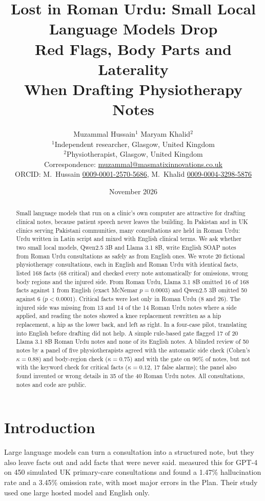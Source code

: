 \documentclass[11pt]{article}
\title{\textbf{Lost in Roman Urdu: Small Local Language Models Drop\\Red Flags, Body Parts and Laterality\\When Drafting Physiotherapy Notes}}
\author{Muzammal Hussain$^{1}$ \qquad Maryam Khalid$^{2}$\\[4pt]
\small $^{1}$Independent researcher, Glasgow, United Kingdom\\
\small $^{2}$Physiotherapist, Glasgow, United Kingdom\\
\small Correspondence: \href{mailto:muzammal@masmatixinnovations.co.uk}{muzammal@masmatixinnovations.co.uk}\\
\small ORCID: M.\ Hussain \href{https://orcid.org/0009-0001-2570-5686}{0009-0001-2570-5686}, M.\ Khalid \href{https://orcid.org/0009-0004-3298-5876}{0009-0004-3298-5876}}
\date{November 2026}
\begin{document}
\maketitle

\begin{abstract}
Small language models that run on a clinic's own computer are attractive for drafting clinical notes, because patient speech never leaves the building. In Pakistan and in UK clinics serving Pakistani communities, many consultations are held in Roman Urdu: Urdu written in Latin script and mixed with English clinical terms. We ask whether two small local models, Qwen2.5 3B and Llama 3.1 8B, write English SOAP notes from Roman Urdu consultations as safely as from English ones. We wrote 20 fictional physiotherapy consultations, each in English and Roman Urdu with identical facts, listed 168 facts (68 critical) and checked every note automatically for omissions, wrong body regions and the injured side. From Roman Urdu, Llama 3.1 8B omitted 16 of 168 facts against 1 from English (exact McNemar $p=0.0003$) and Qwen2.5 3B omitted 50 against 6 ($p<0.0001$). Critical facts were lost only in Roman Urdu (8 and 26). The injured side was missing from 13 and 14 of the 14 Roman Urdu notes where a side applied, and reading the notes showed a knee replacement rewritten as a hip replacement, a hip as the lower back, and left as right. In a four-case pilot, translating into English before drafting did not help. A simple rule-based gate flagged 17 of 20 Llama 3.1 8B Roman Urdu notes and none of its English notes. A blinded review of 50 notes by a panel of five physiotherapists agreed with the automatic side check (Cohen's $\kappa=0.88$) and body-region check ($\kappa=0.75$) and with the gate on 90\% of notes, but not with the keyword check for critical facts ($\kappa=0.12$, 17 false alarms); the panel also found invented or wrong details in 35 of the 40 Roman Urdu notes. All consultations, notes and code are public.
\end{abstract}

\section{Introduction}
Large language models can turn a consultation into a structured note, but they also leave facts out and add facts that were never said. \citet{asgari2025framework} measured this for GPT-4 on 450 simulated UK primary-care consultations and found a 1.47\% hallucination rate and a 3.45\% omission rate, with most major errors in the Plan. Their study used one large hosted model and English only.
\end{document}

